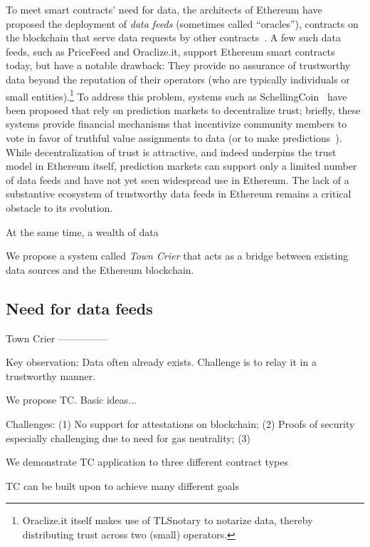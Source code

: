 To meet smart contracts' need for data, the architects of Ethereum have proposed the deployment of \emph{data feeds} (sometimes called ``oracles''), contracts on the blockchain that serve data requests by other contracts~\cite{whitepaper,yellowpaper}. A few such data feeds, such as PriceFeed and Oraclize.it, support Ethereum smart contracts today, but have a notable drawback: They provide no assurance of trustworthy data beyond the reputation of their operators (who are typically individuals or small entities).\footnote{Oraclize.it itself makes use of TLSnotary to notarize data, thereby distributing trust across two (small) operators.} To address this problem, systems such as SchellingCoin~\cite{} have been proposed that rely on prediction markets to decentralize trust; briefly, these systems provide financial mechanisms that incentivize community members to vote in favor of truthful value assignments to data (or to make predictions~\cite{Augur}). While decentralization of trust is attractive, and indeed underpins the trust model in Ethereum itself, prediction markets can support only a limited number of data feeds and have not yet seen widespread use in Ethereum. The lack of a substantive ecosystem of trustworthy data feeds in Ethereum remains a critical obstacle to its evolution. 

At the same time, a wealth of data

We propose a system called \emph{Town Crier} that acts as a bridge between existing data sources and the Ethereum blockchain. 




\subsection{Need for data feeds}




Town Crier
---------------

Key observation: Data often already exists. Challenge is to relay it in a trustworthy manner.

We propose TC. Basic ideas...

Challenges: (1) No support for attestations on blockchain; (2) Proofs of security especially challenging due to need for gas neutrality; (3) 

We demonstrate TC application to three different contract types

TC can be built upon to achieve many different goals 




